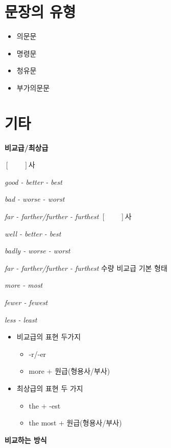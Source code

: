 \documentclass[11pt, twocolumn, a4paper]{oblivoir}
\begin{document}
    \section*{문장의 유형}
    \begin{itemize}
        \item 의문문
        \item 명령문
        \item 청유문
        \item 부가의문문
    \end{itemize}
    
    \section*{기타}
\noindent    \textbf{비교급/최상급}

\noindent     $[\qquad]$사 

    \emph{good - better - best}

    \emph{bad - worse - worst}

    \emph{far - farther/further - furthest}
\newline
    $[\qquad]$사

    \emph{well - better - best}

    \emph{badly - worse - worst}

    \emph{far - farther/further - furthest}
    \newline
    수량 비교급 기본 형태 

    \emph{more - most}

    \emph{fewer - fewest}

    \emph{less - least}
    \begin{itemize}
        \item 비교급의 표현 두가지 
        \begin{itemize}
            \item -r/-er 
            \item more + 원급(형용사/부사)
        \end{itemize}
        \item 최상급의 표현 두 가지 
        \begin{itemize}
            \item the + -est
            \item the most + 원급(형용사/부사)
        \end{itemize}
    \end{itemize}

    \textbf{비교하는 방식}
  
\end{document}
